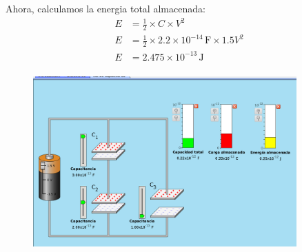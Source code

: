 \documentclass[12pt]{report}
\begin{document}
\begin{enumerate}
Ahora, calculamos la energia total almacenada:\\
\begin{align*}
    E&=\frac{1}{2}\times C\times V^2\\[6pt]
    E&=\frac{1}{2}\times 2.2 \times 10^{-14} \, \text{F} \times 1.5V^2\\[6pt]
    E&= 2.475 \times 10^{-13} \, \text{J}\\[6pt]
\end{align*}

\begin{figure}[h]
    \centering
    \includegraphics[width=0.9\textwidth]{./images/foto2ejercicio3Conexiondecapacitores.png}
\end{figure}



\end{enumerate}
\end{document}
